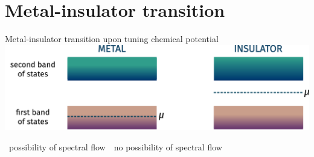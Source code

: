 \documentclass[aspectratio=169]{beamer}
\begin{document}
\section{Metal-insulator transition}

\begin{frame}{Metal-insulator transition upon tuning chemical potential}
\includegraphics[width=\textwidth]{transition.pdf}

\vspace*{\fill}
\hspace*{\fill}~possibility of spectral flow~\hspace*{\fill}~no possibility of spectral flow
\end{frame}
\end{document}
